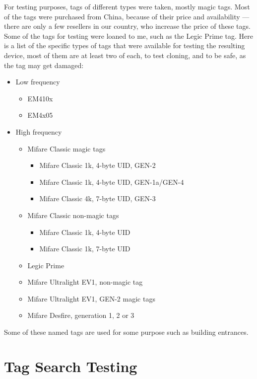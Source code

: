 For testing purposes, tags of different types were taken, mostly magic tags. Most of the tags were purchased from China, because of their price and availability --- there are only a few resellers in our country, who increase the price of these tags. Some of the tags for testing were loaned to me, such as the Legic Prime tag. Here is a list of the specific types of tags that were available for testing the resulting device, most of them are at least two of each, to test cloning, and to be safe, as the tag may get damaged:
\begin{itemize}
    \item Low frequency
    \begin{itemize}
        \item EM410x
        \item EM4x05
    \end{itemize}
    \item High frequency
    \begin{itemize}
        \item Mifare Classic magic tags
        \begin{itemize}
            \item Mifare Classic 1k, 4-byte UID, GEN-2
            \item Mifare Classic 1k, 4-byte UID, GEN-1a/GEN-4
            \item Mifare Classic 4k, 7-byte UID, GEN-3
        \end{itemize}
        \item Mifare Classic non-magic tags
        \begin{itemize}
            \item Mifare Classic 1k, 4-byte UID
            \item Mifare Classic 1k, 7-byte UID
        \end{itemize}
        \item Legic Prime
        \item Mifare Ultralight EV1, non-magic tag
        \item Mifare Ultralight EV1, GEN-2 magic tags
        \item Mifare Desfire, generation 1, 2 or 3
    \end{itemize}
\end{itemize}
Some of these named tags are used for some purpose such as building entrances.

\section{Tag Search Testing}

